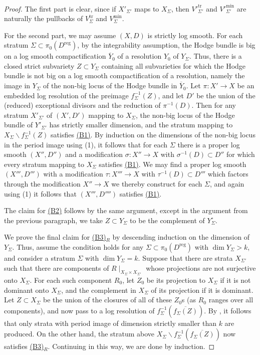 \documentclass{amsart}
\newcommand{\customref}[2]{\hyperref[#1]{#2}}
\newcommand{\bs}{\backslash}
\newcommand{\ol}{\overline}
\theoremstyle{definition}
\theoremstyle{remark}
\def\reg{\mathrm{reg}}
\def\trans{\mathrm{tr}}
\def\mini{\mathrm{min}}
\renewcommand{\bar}[1]{\ol{#1}}
\numberwithin{equation}{section}
\begin{document}
\begin{proof}
The first part is clear, since if $X'_{\Sigma'}$ maps to $ X_\Sigma$, then $V'^\trans_{\Sigma'}$ and $V'^\mini_{\Sigma'}$ are naturally the pullbacks of $V^\trans_\Sigma$ and $V^\mini_\Sigma$.

For the second part, we may assume $(X,D)$ is strictly log smooth.  For each stratum $\Sigma\subset \pi_0(D^\reg)$, by the integrability assumption, the Hodge bundle is big on a log smooth compactification $\bar Y_0$ of a resolution $Y_0$ of $Y_\Sigma$.  Thus, there is a closed strict subvariety $Z\subset Y_\Sigma$ containing all subvarieties for which the Hodge bundle is not big on a log smooth compactification of a resolution, namely the image in $Y_\Sigma$ of the non-big locus of the Hodge bundle in $\bar Y_0$.  Let $\pi:X'\to X$ be an embedded log resolution of the preimage $f_\Sigma^{-1}( Z)$, and let $D'$ be the union of the (reduced) exceptional divisors and the reduction of $\pi^{-1}(D)$.  Then for any stratum $X'_{\Sigma'}$ of $(X',D')$ mapping to $X_\Sigma$, the non-big locus of the Hodge bundle of $Y'_{\Sigma'}$ has strictly smaller dimension, and the stratum mapping to $X_\Sigma\bs f_\Sigma^{-1}(Z)$ satisfies \customref{b1}{(B1)}.  By induction on the dimensions of the non-big locus in the period image using (1), it follows that for each $\Sigma$ there is a proper log smooth $(X'',D'')$ and a modification $\sigma:X''\to X$ with $\sigma^{-1}(D)\subset D''$ for which every stratum mapping to $X_\Sigma$ satisfies \customref{b1}{(B1)}.  We may find a proper log smooth $(X''',D''')$ with a modification $\tau:X'''\to X$ with $\tau^{-1}(D)\subset D'''$ which factors through the modification $X''\to X$ we thereby construct for each $\Sigma$, and again using (1) it follows that $(X''',D'''')$ satisfies \customref{b1}{(B1)}.  

The claim for \customref{b2}{(B2)} follows by the same argument, except in the argument from the previous paragraph, we take $Z\subset Y_\Sigma$ to be the complement of $Y^\circ_\Sigma$.

We prove the final claim for \customref{b3}{(B3)$_R$} by descending induction on the dimension of $Y_\Sigma$.  Thus, assume the condition holds for any $\Sigma\subset\pi_0(D^\reg)$ with $\dim Y_\Sigma>k$, and consider a stratum $\Sigma$ with $\dim Y_\Sigma=k$. Suppose that there are strata $X_{\Sigma'}$ such that there are components of $R\mid_{X_{\Sigma}\times X_{\Sigma'}}$ whose projections are not surjective onto $X_{\Sigma}$. For each such component $R_0$, let $Z_0$ be its projection to $X_\Sigma$ if it is not dominant onto $X_\Sigma$, and the complement in $X_{\Sigma}$ of its projection if it is dominant.  Let $Z\subset X_{\Sigma}$ be the union of the closures of all of these $Z_0$s (as $R_0$ ranges over all components), and now pass to a log resolution of $f_{\Sigma}^{-1}(\ol{f_{\Sigma}(Z)})$. By , it follows that only strata with period image of dimension strictly smaller than $k$ are produced. On the other hand, the stratum above $X_{\Sigma}\bs f_{\Sigma}^{-1}(\ol{f_{\Sigma}(Z)})$ now satisfies \customref{b3}{(B3)$_R$}.  Continuing in this way, we are done by induction.
 \end{proof}
\end{document}
